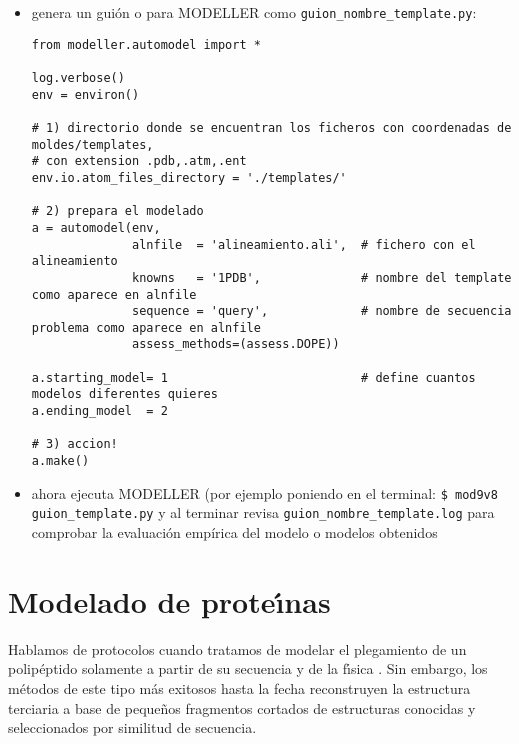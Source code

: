\begin{itemize}
\begin{itemize}
	\item genera un gui\'{o}n o  para MODELLER como \verb+guion_nombre_template.py+:

\begin{verbatim}
from modeller.automodel import *   

log.verbose()    
env = environ() 

# 1) directorio donde se encuentran los ficheros con coordenadas de moldes/templates, 
# con extension .pdb,.atm,.ent
env.io.atom_files_directory = './templates/'

# 2) prepara el modelado
a = automodel(env,
              alnfile  = 'alineamiento.ali',  # fichero con el alineamiento
              knowns   = '1PDB',              # nombre del template como aparece en alnfile
              sequence = 'query',             # nombre de secuencia problema como aparece en alnfile
	          assess_methods=(assess.DOPE))      

a.starting_model= 1                           # define cuantos modelos diferentes quieres
a.ending_model  = 2                 
				  
# 3) accion! 
a.make()                  
\end{verbatim}

	\item ahora ejecuta MODELLER (por ejemplo poniendo en el terminal: \verb+$ mod9v8 guion_template.py+ y al terminar revisa 
	\verb+guion_nombre_template.log+ para comprobar la evaluaci\'{o}n emp\'{i}rica del modelo o modelos obtenidos

\end{itemize}
\end{itemize}




\section{Modelado de prote\'\i{}nas } \label{abinitio}

Hablamos de protocolos  cuando tratamos de modelar
el plegamiento de un polip\'{e}ptido solamente a partir de su secuencia y de la f\'\i{}sica  \citep{Baker2001}. 
Sin embargo, los m\'{e}todos de este tipo
m\'{a}s exitosos hasta la fecha reconstruyen la estructura terciaria a base de peque\~{n}os fragmentos cortados 
de estructuras conocidas y seleccionados por similitud de secuencia. 

